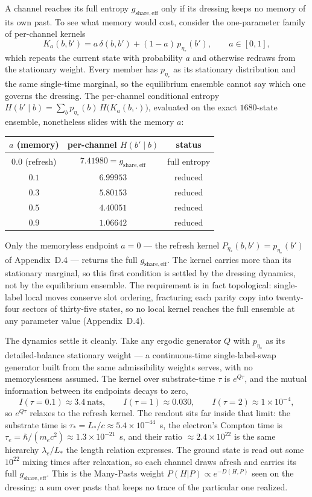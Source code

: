 \documentclass[11pt]{article}
\begin{document}
A channel reaches its full entropy $g_{\mathrm{share,eff}}$ only if its dressing keeps no memory of its own past. To see what memory would cost, consider the one-parameter family of per-channel kernels
\[
K_a(b,b')=a\,\delta(b,b')+(1-a)\,p_{\eta_*}(b'),
\qquad a\in[0,1],
\]
which repeats the current state with probability $a$ and otherwise redraws from the stationary weight. Every member has $p_{\eta_*}$ as its stationary distribution and the same single-time marginal, so the equilibrium ensemble cannot say which one governs the dressing. The per-channel conditional entropy $H(b'\mid b)=\sum_b p_{\eta_*}(b)\,H\bigl(K_a(b,\cdot)\bigr)$, evaluated on the exact $1680$-state ensemble, nonetheless slides with the memory $a$:
\begin{center}
\small
\begin{tabular}{ccc}
\hline
$a$ (memory) & per-channel $H(b'\mid b)$ & status \\
\hline
$0.0$ (refresh) & $7.41980=g_{\mathrm{share,eff}}$ & full entropy \\
$0.1$ & $6.99953$ & reduced \\
$0.3$ & $5.80153$ & reduced \\
$0.5$ & $4.40051$ & reduced \\
$0.9$ & $1.06642$ & reduced \\
\hline
\end{tabular}
\normalsize
\end{center}
Only the memoryless endpoint $a=0$ --- the refresh kernel $P_{\eta_*}(b,b')=p_{\eta_*}(b')$ of Appendix~D.4 --- returns the full $g_{\mathrm{share,eff}}$. The kernel carries more than its stationary marginal, so this first condition is settled by the dressing dynamics, not by the equilibrium ensemble. The requirement is in fact topological: single-label local moves conserve slot ordering, fracturing each parity copy into twenty-four sectors of thirty-five states, so no local kernel reaches the full ensemble at any parameter value (Appendix~D.4).

The dynamics settle it cleanly. Take any ergodic generator $Q$ with $p_{\eta_*}$ as its detailed-balance stationary weight --- a continuous-time single-label-swap generator built from the same admissibility weights serves, with no memorylessness assumed. The kernel over substrate-time $\tau$ is $e^{Q\tau}$, and the mutual information between its endpoints decays to zero,
\[
I(\tau{=}0.1)\approx 3.4~\text{nats},
\qquad
I(\tau{=}1)\approx 0.030,
\qquad
I(\tau{=}2)\approx 1\times10^{-4},
\]
so $e^{Q\tau}$ relaxes to the refresh kernel. The readout sits far inside that limit: the substrate time is $\tau_*=L_*/c\approx5.4\times10^{-44}$~s, the electron's Compton time is $\tau_e=\hbar/(m_ec^2)\approx1.3\times10^{-21}$~s, and their ratio $\approx2.4\times10^{22}$ is the same hierarchy $\lambda_e/L_*$ the length relation expresses. The ground state is read out some $10^{22}$ mixing times after relaxation, so each channel draws afresh and carries its full $g_{\mathrm{share,eff}}$. This is the Many-Pasts weight $P(H|P)\propto e^{-D(H,P)}$ seen on the dressing: a sum over pasts that keeps no trace of the particular one realized.
\end{document}
